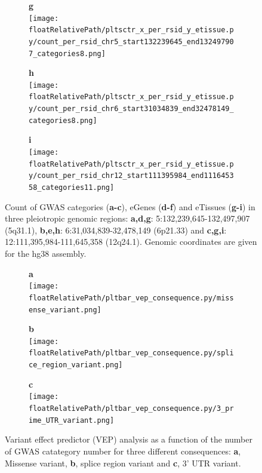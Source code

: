 \begin{figure}[!tbp]
\begin{subfigure}[]{.32\textwidth}
\textbf{g}
\\
\texttt{[image: \\floatRelativePath/pltsctr\_x\_per\_rsid\_y\_etissue.py/count\_per\_rsid\_chr5\_start132239645\_end132497907\_categories8.png]}
\end{subfigure}
%
\begin{subfigure}[]{.32\textwidth}
\textbf{h}
\\
\texttt{[image: \\floatRelativePath/pltsctr\_x\_per\_rsid\_y\_etissue.py/count\_per\_rsid\_chr6\_start31034839\_end32478149\_categories8.png]}
\end{subfigure}
%
\begin{subfigure}[]{.32\textwidth}
\textbf{i}
\\
\texttt{[image: \\floatRelativePath/pltsctr\_x\_per\_rsid\_y\_etissue.py/count\_per\_rsid\_chr12\_start111395984\_end111645358\_categories11.png]}
\end{subfigure}

\caption{Count of GWAS categories (\textbf{a-c}), eGenes (\textbf{d-f}) and eTissues (\textbf{g-i}) in three pleiotropic genomic regions: \textbf{a,d,g}: 5:132,239,645-132,497,907 (5q31.1), \textbf{b,e,h}: 6:31,034,839-32,478,149 (6p21.33) and \textbf{c,g,i}: 12:111,395,984-111,645,358 (12q24.1). Genomic coordinates are given for the hg38 assembly.} \label{fig:region_gwas_egenes_tissues}
%
\end{figure}

%
%

\begin{figure}[!tbp]
\centering
%
\begin{subfigure}[]{.32\textwidth}
\textbf{a}
\\
\texttt{[image: \\floatRelativePath/pltbar\_vep\_consequence.py/missense\_variant.png]}
%
\end{subfigure}
%
\begin{subfigure}[]{.32\textwidth}
\textbf{b}
\\
\texttt{[image: \\floatRelativePath/pltbar\_vep\_consequence.py/splice\_region\_variant.png]}
%
\end{subfigure}
%
\begin{subfigure}[]{.32\textwidth}
\textbf{c}
\\
\texttt{[image: \\floatRelativePath/pltbar\_vep\_consequence.py/3\_prime\_UTR\_variant.png]}
%
\end{subfigure}
%
\caption{Variant effect predictor (VEP) analysis as a function of the number of GWAS catategory number for three different consequences: \textbf{a}, Missense variant, \textbf{b}, splice region variant and \textbf{c}, 3' UTR variant.} \label{fig:vep_consequence}
%
\end{figure}

